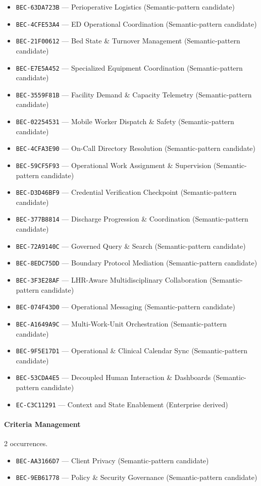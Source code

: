 \documentclass[11pt,a4paper,openany]{book}
\begin{document}
\begin{itemize}
\item \texttt{BEC-63DA723B} --- Perioperative Logistics (Semantic-pattern candidate)
\item \texttt{BEC-4CFE53A4} --- ED Operational Coordination (Semantic-pattern candidate)
\item \texttt{BEC-21F00612} --- Bed State \& Turnover Management (Semantic-pattern candidate)
\item \texttt{BEC-E7E5A452} --- Specialized Equipment Coordination (Semantic-pattern candidate)
\item \texttt{BEC-3559F81B} --- Facility Demand \& Capacity Telemetry (Semantic-pattern candidate)
\item \texttt{BEC-02254531} --- Mobile Worker Dispatch \& Safety (Semantic-pattern candidate)
\item \texttt{BEC-4CFA3E90} --- On-Call Directory Resolution (Semantic-pattern candidate)
\item \texttt{BEC-59CF5F93} --- Operational Work Assignment \& Supervision (Semantic-pattern candidate)
\item \texttt{BEC-D3D46BF9} --- Credential Verification Checkpoint (Semantic-pattern candidate)
\item \texttt{BEC-377B8814} --- Discharge Progression \& Coordination (Semantic-pattern candidate)
\item \texttt{BEC-72A9140C} --- Governed Query \& Search (Semantic-pattern candidate)
\item \texttt{BEC-8EDC75DD} --- Boundary Protocol Mediation (Semantic-pattern candidate)
\item \texttt{BEC-3F3E28AF} --- LHR-Aware Multidisciplinary Collaboration (Semantic-pattern candidate)
\item \texttt{BEC-074F43D0} --- Operational Messaging (Semantic-pattern candidate)
\item \texttt{BEC-A1649A9C} --- Multi-Work-Unit Orchestration (Semantic-pattern candidate)
\item \texttt{BEC-9F5E17D1} --- Operational \& Clinical Calendar Sync (Semantic-pattern candidate)
\item \texttt{BEC-53CDA4E5} --- Decoupled Human Interaction \& Dashboards (Semantic-pattern candidate)
\item \texttt{EC-C3C11291} --- Context and State Enablement (Enterprise derived)
\end{itemize}
\paragraph{Criteria Management} 2 occurrences.\par
\begin{itemize}
\item \texttt{BEC-AA3166D7} --- Client Privacy (Semantic-pattern candidate)
\item \texttt{BEC-9EB61778} --- Policy \& Security Governance (Semantic-pattern candidate)
\end{itemize}
\end{document}
